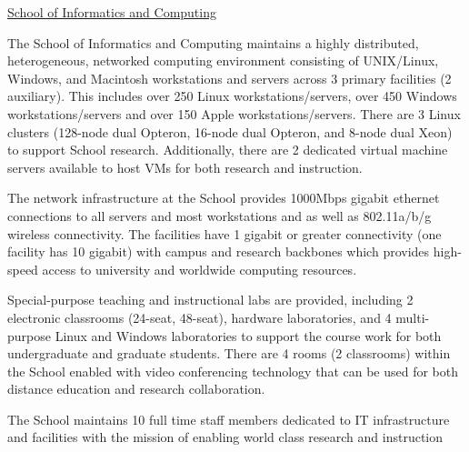 \documentclass[11pt]{article}
\begin{document}
\bigskip
\centerline{\Large{\underline{School of Informatics and Computing}}}
\bigskip

\noindent The School of Informatics and Computing maintains a highly
distributed, heterogeneous, networked computing environment consisting of
UNIX/Linux, Windows, and Macintosh workstations and servers across 3 primary
facilities (2 auxiliary). This includes over 250 Linux workstations/servers,
over 450 Windows workstations/servers and over 150 Apple
workstations/servers. There are 3 Linux clusters (128-node dual Opteron,
16-node dual Opteron, and 8-node dual Xeon) to support School
research. Additionally, there are 2 dedicated virtual machine servers
available to host VMs for both research and instruction.

The network infrastructure at the School provides 1000Mbps gigabit ethernet
connections to all servers and most workstations and as well as 802.11a/b/g
wireless connectivity. The facilities have 1 gigabit or greater connectivity
(one facility has 10 gigabit) with campus and research backbones which
provides high-speed access to university and worldwide computing resources.

Special-purpose teaching and instructional labs are provided, including 2
electronic classrooms (24-seat, 48-seat), hardware laboratories, and 4
multi-purpose Linux and Windows laboratories to support the course work for
both undergraduate and graduate students.  There are 4 rooms (2 classrooms)
within the School enabled with video conferencing technology that can be used
for both distance education and research collaboration.

The School maintains 10 full time staff members dedicated to IT
infrastructure and facilities with the mission of enabling world class
research and instruction
\end{document}
